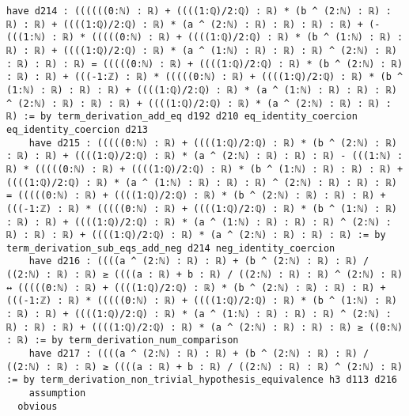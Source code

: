 \documentclass{article}
\begin{document}
\begin{tcolorbox}[colback=white!10, width=\linewidth]
\begin{lstlisting}[language=Lean4]
    have d214 : ((((((0:ℕ) : ℝ) + ((((1:ℚ)/2:ℚ) : ℝ) * (b ^ (2:ℕ) : ℝ) : ℝ) : ℝ) + ((((1:ℚ)/2:ℚ) : ℝ) * (a ^ (2:ℕ) : ℝ) : ℝ) : ℝ) : ℝ) + (-(((1:ℕ) : ℝ) * (((((0:ℕ) : ℝ) + ((((1:ℚ)/2:ℚ) : ℝ) * (b ^ (1:ℕ) : ℝ) : ℝ) : ℝ) + ((((1:ℚ)/2:ℚ) : ℝ) * (a ^ (1:ℕ) : ℝ) : ℝ) : ℝ) ^ (2:ℕ) : ℝ) : ℝ) : ℝ) : ℝ) = (((((0:ℕ) : ℝ) + ((((1:ℚ)/2:ℚ) : ℝ) * (b ^ (2:ℕ) : ℝ) : ℝ) : ℝ) + (((-1:ℤ) : ℝ) * (((((0:ℕ) : ℝ) + ((((1:ℚ)/2:ℚ) : ℝ) * (b ^ (1:ℕ) : ℝ) : ℝ) : ℝ) + ((((1:ℚ)/2:ℚ) : ℝ) * (a ^ (1:ℕ) : ℝ) : ℝ) : ℝ) ^ (2:ℕ) : ℝ) : ℝ) : ℝ) + ((((1:ℚ)/2:ℚ) : ℝ) * (a ^ (2:ℕ) : ℝ) : ℝ) : ℝ) := by term_derivation_add_eq d192 d210 eq_identity_coercion eq_identity_coercion d213
    have d215 : (((((0:ℕ) : ℝ) + ((((1:ℚ)/2:ℚ) : ℝ) * (b ^ (2:ℕ) : ℝ) : ℝ) : ℝ) + ((((1:ℚ)/2:ℚ) : ℝ) * (a ^ (2:ℕ) : ℝ) : ℝ) : ℝ) - (((1:ℕ) : ℝ) * (((((0:ℕ) : ℝ) + ((((1:ℚ)/2:ℚ) : ℝ) * (b ^ (1:ℕ) : ℝ) : ℝ) : ℝ) + ((((1:ℚ)/2:ℚ) : ℝ) * (a ^ (1:ℕ) : ℝ) : ℝ) : ℝ) ^ (2:ℕ) : ℝ) : ℝ) : ℝ) = (((((0:ℕ) : ℝ) + ((((1:ℚ)/2:ℚ) : ℝ) * (b ^ (2:ℕ) : ℝ) : ℝ) : ℝ) + (((-1:ℤ) : ℝ) * (((((0:ℕ) : ℝ) + ((((1:ℚ)/2:ℚ) : ℝ) * (b ^ (1:ℕ) : ℝ) : ℝ) : ℝ) + ((((1:ℚ)/2:ℚ) : ℝ) * (a ^ (1:ℕ) : ℝ) : ℝ) : ℝ) ^ (2:ℕ) : ℝ) : ℝ) : ℝ) + ((((1:ℚ)/2:ℚ) : ℝ) * (a ^ (2:ℕ) : ℝ) : ℝ) : ℝ) := by term_derivation_sub_eqs_add_neg d214 neg_identity_coercion
    have d216 : ((((a ^ (2:ℕ) : ℝ) : ℝ) + (b ^ (2:ℕ) : ℝ) : ℝ) / ((2:ℕ) : ℝ) : ℝ) ≥ ((((a : ℝ) + b : ℝ) / ((2:ℕ) : ℝ) : ℝ) ^ (2:ℕ) : ℝ) ↔ (((((0:ℕ) : ℝ) + ((((1:ℚ)/2:ℚ) : ℝ) * (b ^ (2:ℕ) : ℝ) : ℝ) : ℝ) + (((-1:ℤ) : ℝ) * (((((0:ℕ) : ℝ) + ((((1:ℚ)/2:ℚ) : ℝ) * (b ^ (1:ℕ) : ℝ) : ℝ) : ℝ) + ((((1:ℚ)/2:ℚ) : ℝ) * (a ^ (1:ℕ) : ℝ) : ℝ) : ℝ) ^ (2:ℕ) : ℝ) : ℝ) : ℝ) + ((((1:ℚ)/2:ℚ) : ℝ) * (a ^ (2:ℕ) : ℝ) : ℝ) : ℝ) ≥ ((0:ℕ) : ℝ) := by term_derivation_num_comparison
    have d217 : ((((a ^ (2:ℕ) : ℝ) : ℝ) + (b ^ (2:ℕ) : ℝ) : ℝ) / ((2:ℕ) : ℝ) : ℝ) ≥ ((((a : ℝ) + b : ℝ) / ((2:ℕ) : ℝ) : ℝ) ^ (2:ℕ) : ℝ) := by term_derivation_non_trivial_hypothesis_equivalence h3 d113 d216
    assumption
  obvious

\end{lstlisting}
\end{tcolorbox}
\end{document}
